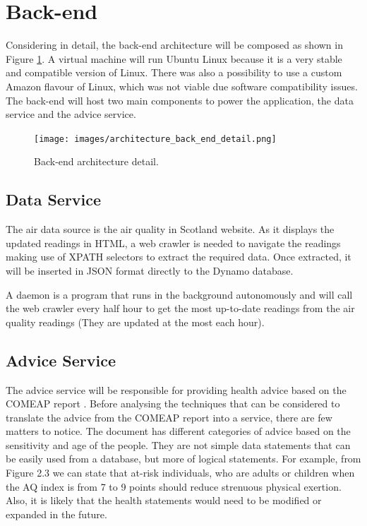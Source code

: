 \section{Back-end}
Considering in detail, the back-end architecture will be composed as shown in Figure \ref{fig:architecture_back_end_detail}. A virtual machine will run Ubuntu Linux because it is a very stable and compatible version of Linux. There was also a possibility to use a custom Amazon flavour of Linux, which was not viable due software compatibility issues. The back-end will host two main components to power the application, the data service and the advice service. 

\begin{figure}[H]
\begin{adjustbox}{width=.6\textwidth,center=\textwidth}
  \centering
  \texttt{[image: images/architecture\_back\_end\_detail.png]}
\end{adjustbox}
  \caption[Back-end architecture]{Back-end architecture detail.}
  \label{fig:architecture_back_end_detail}
\end{figure}


\subsection{Data Service}
 The air data source is the air quality in Scotland website. As it displays the updated readings in HTML, a web crawler is needed to navigate the readings making use of XPATH selectors to extract the required data. Once extracted, it will be inserted in JSON format directly to the Dynamo database.
 
A daemon is a program that runs in the background autonomously and will call the web crawler every half hour to get the most up-to-date readings from the air quality readings (They are updated at the most each hour). 

\subsection{Advice Service}
The advice service will be responsible for providing health advice based on the COMEAP report \cite{HealthProtectionAgencyfortheCommitteeontheMedicalEffectsofAirPollutants2011}. Before analysing the techniques that can be considered to translate the advice from the COMEAP report into a service, there are few matters to notice. The document has different categories of advice based on the sensitivity and age of the people. They are not simple data statements that can be easily used from a database, but more of logical statements. For example, from Figure 2.3 we can state that at-risk individuals, who are adults or children when the AQ index is from 7 to 9 points should reduce strenuous physical exertion. Also, it is likely that the health statements would need to be modified or expanded in the future. 

